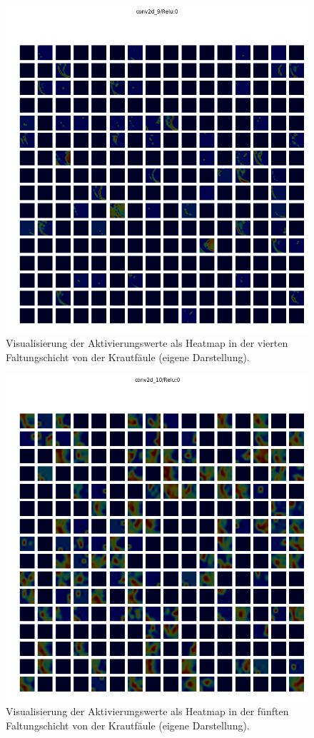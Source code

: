 \begin{figure}[h!]
	\centering
	\includegraphics[width=\textwidth]{visualisierungen/late/heatmap_mit/conv2d_9.png}
	\caption{Visualisierung der Aktivierungswerte als Heatmap in der vierten Faltungschicht von der Krautfäule (eigene Darstellung).}
	\label{}
\end{figure}

\begin{figure}[h!]
	\centering
	\includegraphics[width=\textwidth]{visualisierungen/late/heatmap_mit/conv2d_10.png}
	\caption{Visualisierung der Aktivierungswerte als Heatmap in der fünften Faltungschicht von der Krautfäule (eigene Darstellung).}
	\label{}
\end{figure}